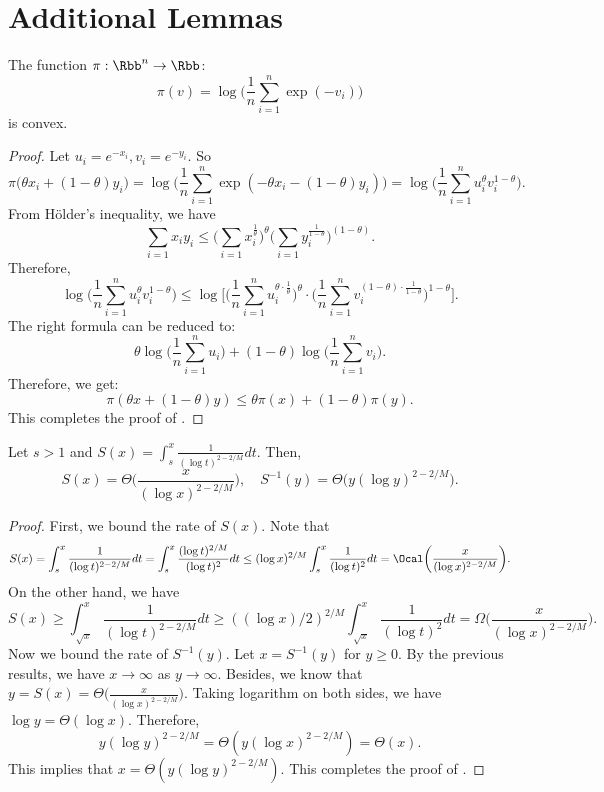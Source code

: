 \section{Additional Lemmas} \label{sec:proof:additional}
\begin{lemma}
\label{lem:log-sum-convex}
    The function $\pi: \Rbb^n \to \Rbb$: 
    \[
        \pi(v) = \log \bigg ( \frac{1}{n} \sum_{i=1}^{n} \exp(-v_i) \bigg)
    \]
    is convex. 
\end{lemma}
\begin{proof}
Let $u_i = e^{-x_i}, v_i = e^{-y_i}$. So 
\[
    \pi\big(\theta x_i + (1-\theta) y_i\big) = \log \bigg( \frac{1}{n} \sum_{i=1}^{n} \exp(-\theta x_i - (1-\theta) y_i) \bigg) = \log \bigg( \frac{1}{n} \sum_{i=1}^{n} u_i^{\theta } v_i^{1-\theta } \bigg). 
\]
From H\"older's inequality, we have 
\[
    \sum_{i=1}x_i y_i \le  \bigg( \sum_{i=1} x_i^{\frac{1}{\theta }} \bigg)^{\theta} \bigg( \sum_{i=1} y_i^{\frac{1}{1-\theta }} \bigg)^{(1-\theta)}.
\]
Therefore, 
\[
  \log \bigg( \frac{1}{n} \sum_{i=1}^{n} u_i^{\theta } v_i^{1-\theta } \bigg) \le \log \Bigg[ \bigg(\frac{1}{n}\sum_{i=1}^n u_i^{\theta \cdot \frac{1}{\theta }} \bigg)^\theta  \cdot \bigg( \frac{1}{n} \sum_{i=1}^n v_i^{(1-\theta) \cdot \frac{1}{1-\theta}} \bigg)^{1-\theta} \Bigg] . 
\]
The right formula can be reduced to: 
\[
    \theta \log \bigg( \frac{1}{n} \sum_{i=1}^{n} u_i \bigg) + (1-\theta) \log \bigg( \frac{1}{n} \sum_{i=1}^{n} v_i \bigg).
\]
Therefore, we get: 
\[
    \pi(\theta x + (1-\theta) y) \le \theta \pi(x) + (1-\theta) \pi(y).
\]
This completes the proof of .
\end{proof}
\begin{lemma} 
\label{lem:int-log}
Let $s>1$ and $S(x) = \int_s^x \frac{1}{(\log t)^{2-2/M}} dt$. Then, 
\[
    S(x) = \Theta \bigg( \frac{x}{ (\log x)^{2-2/M}} \bigg), \quad S^{-1}(y) = \Theta \Big( y (\log y)^{2-2/M} \Big). 
\]
\end{lemma}
\begin{proof}

First, we bound the rate of $S(x)$.  Note that 
\[
    S(x)  = \int_s^x \frac{1}{(\log t)^{2-2/M}} dt  = \int_s^x \frac{(\log t)^{2/M}}{(\log t)^{2}} dt \le (\log x)^{2/M} \int_s^x \frac{1}{(\log t)^{2}} dt  = \Ocal  \bigg(  \frac{x}{ (\log x)^{2-2/M}}\bigg). 
\]
On the other hand, we have 
\[
    S(x) \ge \int_{\sqrt{x}}^x \frac{1}{(\log t)^{2-2/M}} dt \ge (  ( \log x)/2)^{2/M} \int_{\sqrt{x}}^x \frac{1}{(\log t)^{2}} dt = \Omega \bigg(  \frac{x}{ (\log x)^{2-2/M}}\bigg).
\]
Now we bound the rate of $S^{-1}(y)$. Let $x = S^{-1}(y)$ for $y\ge 0$. By the previous results, we have $x\to \infty$ as $y\to \infty$. Besides, we know that $y = S(x) = \Theta \Big( \frac{x}{ (\log x)^{2-2/M}} \Big)$. Taking logarithm on both sides, we have $\log y = \Theta ( \log x)$. Therefore, 
\[
    y (\log y)^{2-2/M} = \Theta ( y (\log x)^{2-2/M}) = \Theta (x). 
\] 
This implies that $x = \Theta (y (\log y)^{2-2/M})$. This completes the proof of .
\end{proof}

